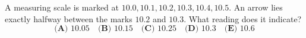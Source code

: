 A measuring scale is marked at $10.0,10.1,10.2,10.3,10.4,10.5$. An arrow lies exactly halfway between the marks $10.2$ and $10.3$. What reading does it indicate?
\[\textbf{(A) }10.05\quad\textbf{(B) }10.15\quad\textbf{(C) }10.25\quad\textbf{(D) }10.3\quad\textbf{(E) }10.6\]
